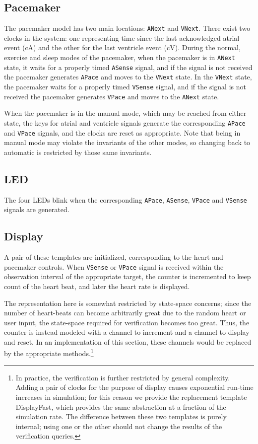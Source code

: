 \documentclass[a4paper]{article}
\begin{document}
\subsection{Pacemaker} The pacemaker model has two main locations: {\tt ANext} and {\tt VNext}. There exist two clocks in the system: one representing time since the last acknowledged atrial event (cA) and the other for the last ventricle event (cV). During the normal, exercise and sleep modes of the pacemaker, when the pacemaker is in {\tt ANext} state, it waits for a properly timed {\tt ASense} signal, and if the signal is not received the pacemaker generates {\tt APace} and moves to the {\tt VNext} state. In the {\tt VNext} state, the pacemaker waits for a properly timed {\tt VSense} signal, and if the signal is not received the pacemaker generates {\tt VPace} and moves to the {\tt ANext} state.

When the pacemaker is in the manual mode, which may be reached from either state, the keys for atrial and ventricle signals generate the corresponding {\tt APace} and {\tt VPace} signals, and the clocks are reset as appropriate.  Note that being in manual mode may violate the invariants of the other modes, so changing back to automatic is restricted by those same invariants.

\subsection{LED} The four LEDs blink when the corresponding {\tt APace}, {\tt ASense}, {\tt VPace} and {\tt VSense} signals are generated.

\subsection{Display} A pair of these templates are initialized, corresponding to the heart and pacemaker controls.  When {\tt VSense} or {\tt VPace} signal is received within the observation interval of the appropriate target, the counter is incremented to keep count of the heart beat, and later the heart rate is displayed. 

The representation here is somewhat restricted by state-space concerns; since the number of heart-beats can become arbitrarily great due to the random heart or user input, the state-space required for verification becomes too great.  Thus, the counter is instead modeled with a channel to increment and a channel to display and reset.  In an implementation of this section, these channels would be replaced by the appropriate methods.\footnote{In practice, the verification is further restricted by general complexity.  Adding a pair of clocks for the purpose of display causes exponential run-time increases in simulation; for this reason we provide the replacement template DisplayFast, which provides the same abstraction at a fraction of the simulation rate.  The difference between these two templates is purely internal; using one or the other should not change the results of the verification queries.}
\end{document}
